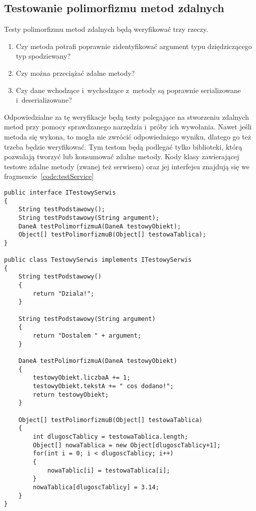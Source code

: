 \subsection{Testowanie polimorfizmu metod zdalnych}
Testy polimorfizmu metod zdalnych będą weryfikować trzy rzeczy.
\begin{enumerate}
	\item Czy metoda potrafi poprawnie zidentyfikować argument typu dziędziczącego typ spodziewany?
	\item Czy można przeciążać zdalne metody?
	\item Czy dane wchodzące i~wychodzące z~metody są poprawnie serializowane i~deserializowane?
\end{enumerate}

Odpowiedzialne za tę weryfikacje będą testy polegające na stworzeniu zdalnych metod przy pomocy sprawdzanego narzędzia i~próby ich wywołania.
Nawet jeśli metoda się wykona, to mogła nie zwrócić odpowiedniego wyniku, dlatego go też trzeba będzie weryfikować.
Tym testom będą podlegać tylko biblioteki, którą pozwalają tworzyć lub konsumować zdalne metody.
Kody klasy zawierającej testowe zdalne metody (zwanej też serwisem) oraz jej interfejsu znajdują się we fragmencie~\ref{code:testService}

\begin{lstlisting}[float, frame=single, caption={Przykładowa zdalna metoda testowana pod kątem polimorfizmu}, label=code:testService]
public interface ITestowySerwis
{
    String testPodstawowy();
    String testPodstawowy(String argument);    
    DaneA testPolimorfizmuA(DaneA testowyObiekt);    
    Object[] testPolimorfizmuB(Object[] testowaTablica);
}

public class TestowySerwis implements ITestowySerwis
{
    String testPodstawowy()
    {
        return "Dziala!";
    }
        
    String testPodstawowy(String argument)
    {
        return "Dostalem " + argument;
    }
    
    DaneA testPolimorfizmuA(DaneA testowyObiekt)
    {
        testowyObiekt.liczbaA += 1;
        testowyObiekt.tekstA += " cos dodano!";
        return testowyObiekt;
    }
    
    Object[] testPolimorfizmuB(Object[] testowaTablica)
    {
        int dlugoscTablicy = testowaTablica.length;
        Object[] nowaTablica = new Object[dlugoscTablicy+1];
        for(int i = 0; i < dlugoscTablicy; i++)
        {
            nowaTablic[i] = testowaTablica[i];
        }
        nowaTablica[dlugoscTablicy] = 3.14;
    }
}
\end{lstlisting}


